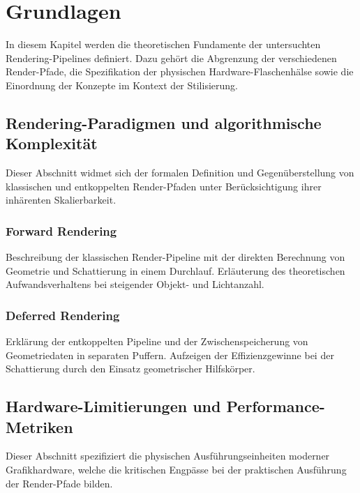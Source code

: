 \chapter{Grundlagen}
\label{ch:02_grundlagen}

In diesem Kapitel werden die theoretischen Fundamente der untersuchten Rendering-Pipelines definiert.
Dazu gehört die Abgrenzung der verschiedenen Render-Pfade, die Spezifikation der physischen Hardware-Flaschenhälse sowie die Einordnung der Konzepte im Kontext der Stilisierung.


\section{Rendering-Paradigmen und algorithmische Komplexität}
\label{sec:0201_rendering_paradigms_and_complexity}

Dieser Abschnitt widmet sich der formalen Definition und Gegenüberstellung von klassischen und entkoppelten Render-Pfaden unter Berücksichtigung ihrer inhärenten Skalierbarkeit.

\subsection{Forward Rendering}
\label{subsec:020101_forward_rendering_core}
Beschreibung der klassischen Render-Pipeline mit der direkten Berechnung von Geometrie und Schattierung in einem Durchlauf. Erläuterung des theoretischen Aufwandsverhaltens bei steigender Objekt- und Lichtanzahl.

\subsection{Deferred Rendering}
\label{subsec:020102_deferred_rendering_core}
Erklärung der entkoppelten Pipeline und der Zwischenspeicherung von Geometriedaten in separaten Puffern. Aufzeigen der Effizienzgewinne bei der Schattierung durch den Einsatz geometrischer Hilfskörper.


\section{Hardware-Limitierungen und Performance-Metriken}
\label{sec:0202_hardware_limitations_and_metrics}

Dieser Abschnitt spezifiziert die physischen Ausführungseinheiten moderner Grafikhardware, welche die kritischen Engpässe bei der praktischen Ausführung der Render-Pfade bilden.

